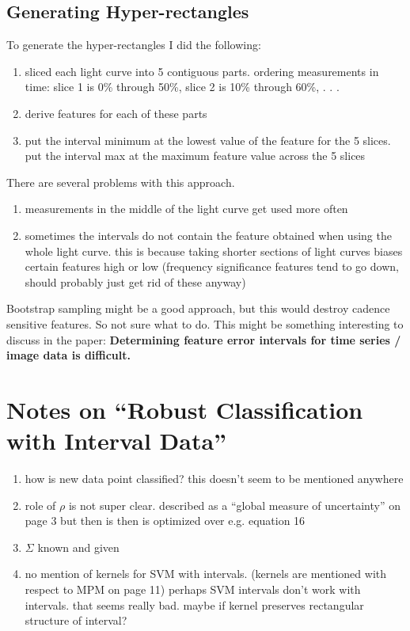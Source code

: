\documentclass[11pt]{article}
\begin{document}
\subsection{Generating Hyper-rectangles}
To generate the hyper-rectangles I did the following:
\begin{enumerate}
\item sliced each light curve into 5 contiguous parts. ordering measurements in time: slice 1 is 0\% through 50\%, slice 2 is 10\% through 60\%, . . .
\item derive features for each of these parts
\item put the interval minimum at the lowest value of the feature for the 5 slices. put the interval max at the maximum feature value across the 5 slices
\end{enumerate}
There are several problems with this approach.
\begin{enumerate}
\item measurements in the middle of the light curve get used more often
\item sometimes the intervals do not contain the feature obtained when using the whole light curve. this is because taking shorter sections of light curves biases certain features high or low (frequency significance features tend to go down, should probably just get rid of these anyway)
\end{enumerate}
Bootstrap sampling might be a good approach, but this would destroy cadence sensitive features. So not sure what to do. This might be something interesting to discuss in the paper: \textbf{Determining feature error intervals for time series / image data is difficult.}



\section{Notes on ``Robust Classification with Interval Data''}
\begin{enumerate}
\item how is new data point classified? this doesn't seem to be mentioned anywhere
\item role of $\rho$ is not super clear. described as a ``global measure of uncertainty'' on page 3 but then is then is optimized over e.g. equation 16
\item $\Sigma$ known and given
\item no mention of kernels for SVM with intervals. (kernels are mentioned with respect to MPM on page 11) perhaps SVM intervals don't work with intervals. that seems really bad. maybe if kernel preserves rectangular structure of interval?
\end{enumerate}
\end{document}
